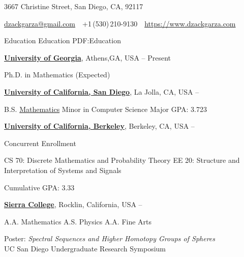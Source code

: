 \documentclass[letterpaper,MMMyyyy,nonstopmode]{simpleresumecv}
\newcommand{\CVAuthor}{D. Zack Garza}
\newcommand{\CVWebpage}{https://www.dzackgarza.com}
\begin{document}

\Title{\CVAuthor}

\begin{SubTitle}
3667 Christine Street, San Diego, CA, 92117
\par
\href{mailto:dzackgarza@gmail.com}
{dzackgarza@gmail.com}
\,\SubBulletSymbol\,
+1\,(530)\,210-9130
\,\SubBulletSymbol\,
\href{\CVWebpage}
{\url{\CVWebpage}}
\end{SubTitle}

\begin{Body}


\Section
{Education}
{Education}
{PDF:Education}

\Entry
\href{https://www.math.uga.edu/}
{\textbf{University of Georgia}},
Athens,GA, USA
\hfill
{} --
Present

\Gap
\BulletItem Ph.D. in Mathematics (Expected)

\BigGap
\Entry
\href{https://www.math.ucsd.edu}
{\textbf{University of California, San Diego}},
La Jolla, CA, USA
\hfill
{} --

\Gap
\BulletItem
B.S.
\href{https://math.ucsd.edu/programs/undergraduate/}
{Mathematics}
\BulletItem Minor in Computer Science
\BulletItem
Major GPA: 3.723

\BigGap
\Entry
\href{https://eecs.berkeley.edu}
{\textbf{University of California, Berkeley}},
Berkeley, CA, USA
\hfill
{} --
\Gap

\BulletItem
Concurrent Enrollment
\begin{Detail}
\SubBulletItem
CS 70: Discrete Mathematics and Probability Theory
\SubBulletItem
EE 20: Structure and Interpretation of Systems and Signals
\end{Detail}
\BulletItem
Cumulative GPA: 3.33


\BigGap
\Entry
\href{https://www.sierracollege.edu}
{\textbf{Sierra College}},
Rocklin, California, USA
\hfill
{} --

\Gap
\BulletItem
A.A. Mathematics
\hfill
\BulletItem
A.S. Physics
\hfill
\BulletItem
A.A. Fine Arts

\BulletItem
Poster: \textit{Spectral Sequences and Higher Homotopy Groups of Spheres} \\
UC San Diego Undergraduate Research Symposium
\hfill {}




\end{Body}
\end{document}
